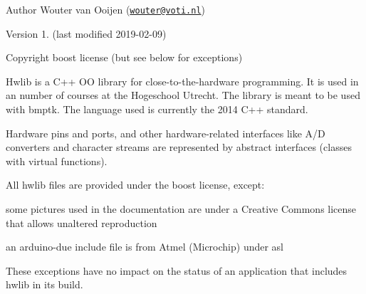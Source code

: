 

\begin{DoxyAuthor}{Author}
Wouter van Ooijen (\href{mailto:wouter@voti.nl}{\tt wouter@voti.\+nl}) 
\end{DoxyAuthor}
\begin{DoxyVersion}{Version}
1. (last modified 2019-\/02-\/09) 
\end{DoxyVersion}
\begin{DoxyCopyright}{Copyright}
boost license (but see below for exceptions) 


\end{DoxyCopyright}
Hwlib is a C++ OO library for close-\/to-\/the-\/hardware programming. It is used in an number of courses at the Hogeschool Utrecht. The library is meant to be used with bmptk. The language used is currently the 2014 C++ standard.

Hardware pins and ports, and other hardware-\/related interfaces like A/D converters and character streams are represented by abstract interfaces (classes with virtual functions). 



All hwlib files are provided under the boost license, except\+:
\begin{DoxyItemize}
\item some pictures used in the documentation are under a Creative Commons license that allows unaltered reproduction
\item an arduino-\/due include file is from Atmel (Microchip) under asl
\end{DoxyItemize}

These exceptions have no impact on the status of an application that includes hwlib in its build. 